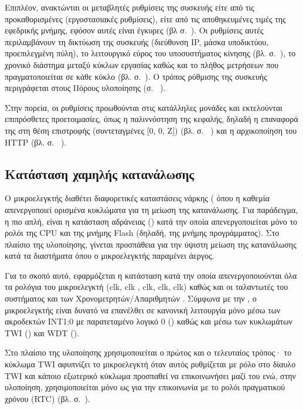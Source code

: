 Επιπλέον, ανακτώνται οι μεταβλητές ρυθμίσεις της συσκευής είτε από τις
προκαθορισμένες (εργοστασιακές ρυθμίσεις), είτε από τις αποθηκευμένες τιμές της
εφεδρικής μνήμης, εφόσον αυτές είναι έγκυρες (βλ 
σ.~\pageref{subsec:backup-memory}).
Οι ρυθμίσεις αυτές περιλαμβάνουν τη δικτύωση της συσκευής (διεύθυνση IP, μάσκα
υποδικτύου, προεπιλεγμένη πύλη), το λειτουργικό εύρος του υποσυστήματος κίνησης
(βλ.  σ.~\pageref{sec:motor:coordinates}), το
χρονικό διάστημα μεταξύ κύκλων εργασίας καθώς και το πλήθος μετρήσεων που
πραγματοποιείται σε κάθε κύκλο (βλ.  σ.~\pageref{sec:task}).
Ο τρόπος ρύθμισης της συσκευής περιγράφεται στους Πόρους υλοποίησης (σ.~%
\pageref{sec:network:impl-resources}).

Στην πορεία, οι ρυθμίσεις προωθούνται στις κατάλληλες μονάδες και εκτελούνται
επιπρόσθετες προετοιμασίες, όπως η παλιννόστηση της κεφαλής, δηλαδή η επαναφορά
της στη θέση επιστροφής (συντεταγμένες [0, 0, Z]) (βλ. σ.~%
\pageref{sec:motor:homing}) και η αρχικοποίηση του HTTP  (βλ. σ.~%
\pageref{ssubsec:network:port_mr}).


\subsection{Κατάσταση χαμηλής κατανάλωσης}

Ο μικροελεγκτής διαθέτει διαφορετικές καταστάσεις νάρκης (
όπου η καθεμία απενεργοποιεί ορισμένα κυκλώματα για τη μείωση της κατανάλωσης.
Για παράδειγμα, η πιο απλή, είναι η κατάσταση αδράνειας () κατά την
οποία απενεργοποιείται μόνο το ρολόι της CPU και της μνήμης Flash (δηλαδή, της
μνήμης προγράμματος). Στο πλαίσιο της υλοποίησης, γίνεται προσπάθεια για την
ύψιστη μείωση της κατανάλωσης κατά τα διαστήματα όπου ο μικροελεγκτής παραμένει
άεργος.

Για το σκοπό αυτό, εφαρμόζεται η κατάσταση  κατά την οποία
απενεργοποιούνται όλα τα ρολόγια του μικροελεγκτή (clk, clk%
, clk, clk, clk) καθώς και οι
ταλαντωτές του συστήματος και των Χρονομετρητών\slash{}Απαριθμητών \parencite%
[38]{atmel13}. Σύμφωνα με την \textcite[38]{atmel13}, ο μικροελεγκτής είναι
δυνατό να επανέλθει σε κανονική λειτουργία μόνο μέσω των ακροδεκτών INT1:0 με
παρατεταμένο λογικό 0 () καθώς και μέσω των κυκλωμάτων
TWI () και WDT ().

Στο πλαίσιο της υλοποίησης χρησιμοποιείται ο πρώτος και ο τελευταίος τρόπος· το
κύκλωμα TWI αφυπνίζει το μικροελεγκτή όταν αυτός ρυθμίζεται με ρόλο 
στο δίαυλο TWI και κάποιο εξωτερικό κύκλωμα προσπαθεί να επικοινωνήσει μαζί του
ενώ, στην υλοποίηση, χρησιμοποιείται μόνο ως  για την επικοινωνία με
το ρολόι πραγματικού χρόνου (RTC) (βλ.  σ.~\pageref{sec:rtc}).

